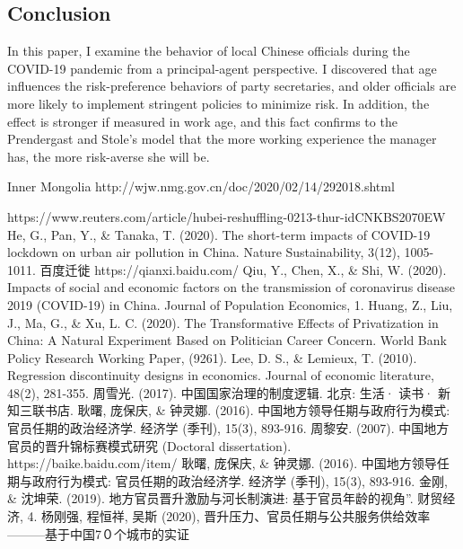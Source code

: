 \documentclass{article}
\begin{document}
\begin{CJK}{UTF8}{gbsn}
\section{Conclusion}

In this paper, I examine the behavior of local Chinese officials during the COVID-19 pandemic from a principal-agent perspective. I discovered that age influences the risk-preference behaviors of party secretaries, and older officials are more likely to implement stringent policies to minimize risk. In addition, the effect is stronger if measured in work age, and this fact confirms to the Prendergast and Stole's model that the more working experience the manager has, the more risk-averse she will be. 



\begin{thebibliography}{999}	

	Inner Mongolia http://wjw.nmg.gov.cn/doc/2020/02/14/292018.shtml


	https://www.reuters.com/article/hubei-reshuffling-0213-thur-idCNKBS2070EW
	He, G., Pan, Y., \& Tanaka, T. (2020). The short-term impacts of COVID-19 lockdown on urban air pollution in China. Nature Sustainability, 3(12), 1005-1011.
	百度迁徙 https://qianxi.baidu.com/
	Qiu, Y., Chen, X., \& Shi, W. (2020). Impacts of social and economic factors on the transmission of coronavirus disease 2019 (COVID-19) in China. Journal of Population Economics, 1.
	Huang, Z., Liu, J., Ma, G., \& Xu, L. C. (2020). The Transformative Effects of Privatization in China: A Natural Experiment Based on Politician Career Concern. World Bank Policy Research Working Paper, (9261).
	Lee, D. S., \& Lemieux, T. (2010). Regression discontinuity designs in economics. Journal of economic literature, 48(2), 281-355.
	周雪光. (2017). 中国国家治理的制度逻辑. 北京: 生活· 读书· 新知三联书店.
	耿曙, 庞保庆, \& 钟灵娜. (2016). 中国地方领导任期与政府行为模式: 官员任期的政治经济学. 经济学 (季刊), 15(3), 893-916.
	周黎安. (2007). 中国地方官员的晋升锦标赛模式研究 (Doctoral dissertation).
	https://baike.baidu.com/item/%
	耿曙, 庞保庆, \& 钟灵娜. (2016). 中国地方领导任期与政府行为模式: 官员任期的政治经济学. 经济学 (季刊), 15(3), 893-916.
	金刚, \& 沈坤荣. (2019). 地方官员晋升激励与河长制演进: 基于官员年龄的视角''. 财贸经济, 4.
	杨刚强, 程恒祥, 吴斯 (2020), 晋升压力、官员任期与公共服务供给效率———基于中国7０个城市的实证


\end{thebibliography}
\end{CJK}
\end{document}
